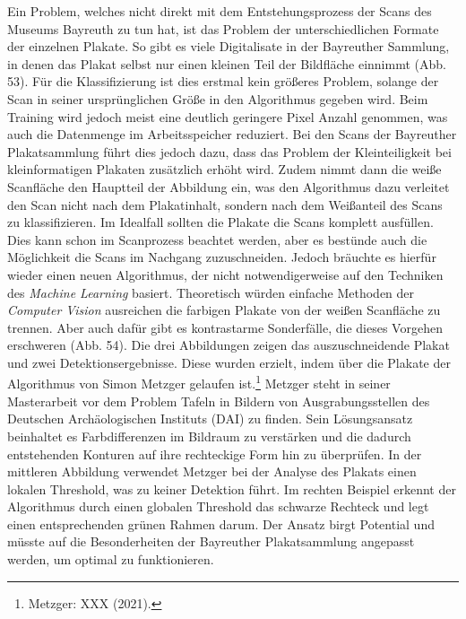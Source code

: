 \documentclass[a4paper,12pt,ngerman]{article}
\begin{document}
Ein Problem, welches nicht direkt mit dem Entstehungsprozess der Scans des Museums Bayreuth zu tun hat, ist das Problem der unterschiedlichen Formate der einzelnen Plakate. So gibt es viele Digitalisate in der Bayreuther Sammlung, in denen das Plakat selbst nur einen kleinen Teil der Bildfläche einnimmt (Abb. 53). Für die Klassifizierung ist dies erstmal kein größeres Problem, solange der Scan in seiner ursprünglichen Größe in den Algorithmus gegeben wird. Beim Training wird jedoch meist eine deutlich geringere Pixel Anzahl genommen, was auch die Datenmenge im Arbeitsspeicher reduziert. Bei den Scans der Bayreuther Plakatsammlung führt dies jedoch dazu, dass das Problem der Kleinteiligkeit bei kleinformatigen Plakaten zusätzlich erhöht wird. Zudem nimmt dann die weiße Scanfläche den Hauptteil der Abbildung ein, was den Algorithmus dazu verleitet den Scan nicht nach dem Plakatinhalt, sondern nach dem Weißanteil des Scans zu klassifizieren. Im Idealfall sollten die Plakate die Scans komplett ausfüllen. Dies kann schon im Scanprozess beachtet werden, aber es bestünde auch die Möglichkeit die Scans im Nachgang zuzuschneiden. Jedoch bräuchte es hierfür wieder einen neuen Algorithmus, der nicht notwendigerweise auf den Techniken des \textit{Machine Learning} basiert. Theoretisch würden einfache Methoden der \textit{Computer Vision} ausreichen die farbigen Plakate von der weißen Scanfläche zu trennen. Aber auch dafür gibt es kontrastarme Sonderfälle, die dieses Vorgehen erschweren (Abb. 54). Die drei Abbildungen zeigen das auszuschneidende Plakat und zwei Detektionsergebnisse. Diese wurden erzielt, indem über die Plakate der Algorithmus von Simon Metzger gelaufen ist.\footnote{Metzger: XXX (2021).}  Metzger steht in seiner Masterarbeit vor dem Problem Tafeln in Bildern von Ausgrabungsstellen des Deutschen Archäologischen Instituts (DAI) zu finden. Sein Lösungsansatz beinhaltet es Farbdifferenzen im Bildraum zu verstärken und die dadurch entstehenden Konturen auf ihre rechteckige Form hin zu überprüfen. In der mittleren Abbildung verwendet Metzger bei der Analyse des Plakats einen lokalen Threshold, was zu keiner Detektion führt. Im rechten Beispiel erkennt der Algorithmus durch einen globalen Threshold das schwarze Rechteck und legt einen entsprechenden grünen Rahmen darum. Der Ansatz birgt Potential und müsste auf die Besonderheiten der Bayreuther Plakatsammlung angepasst werden, um optimal zu funktionieren. \\
\end{document}
